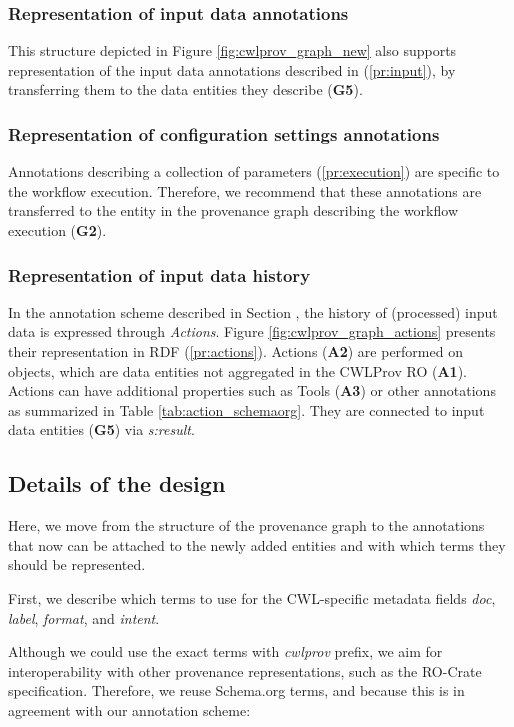 \subsubsection{Representation of input data annotations}
This structure depicted in Figure \ref{fig:cwlprov_graph_new} also supports representation of the input data annotations described in \emph{} (\ref{pr:input}), by transferring them to the data entities they describe (\textbf{G5}). 


\subsubsection{Representation of configuration settings annotations} Annotations describing a collection of parameters (\ref{pr:execution}) are specific to the workflow execution. Therefore, we recommend that these annotations are transferred to the entity in the provenance graph describing the workflow execution (\textbf{G2}).

\subsubsection{Representation of input data history}
In the annotation scheme described in Section \emph{}, the history of (processed) input data is expressed through \emph{Actions}. Figure \ref{fig:cwlprov_graph_actions} presents their representation in RDF (\ref{pr:actions}). 
Actions (\textbf{A2}) are performed on objects, which are data entities not aggregated in the CWLProv RO (\textbf{A1}). Actions can have additional properties such as Tools (\textbf{A3}) or other annotations as summarized in Table \ref{tab:action_schemaorg}. They are connected to input data entities (\textbf{G5}) via \emph{s:result}. 



\subsection{Details of the design}
\label{sec:ext_details}
Here, we move from the structure of the provenance graph to the annotations that now can be attached to the newly added entities and with which terms they should be represented.

First, we describe which terms to use for the CWL-specific metadata fields \emph{doc}, \emph{label}, \emph{format}, and \emph{intent}.

Although we could use the exact terms with \emph{cwlprov} prefix, we aim for interoperability with other provenance representations, such as the RO-Crate specification. Therefore, we reuse Schema.org terms, and because this is in agreement with our annotation scheme:

